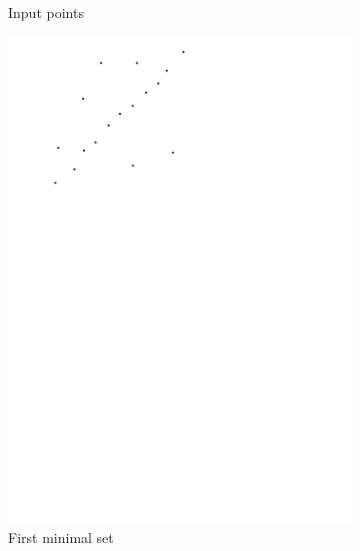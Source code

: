 \begin{figure}[htb]
\begin{subfigure}[b]{0.24\linewidth}
		\caption{Input points}
		\label{fig:ransac:a}
	\end{subfigure}
	\begin{subfigure}[b]{0.24\linewidth}
		\centering
		\includegraphics[width=\textwidth,page=2]{figs/ransac.pdf}
		\caption{First minimal set}
		\label{fig:ransac:b}
	\end{subfigure}
	\begin{subfigure}[b]{0.24\linewidth}
		\centering

\end{subfigure}
\end{figure}
